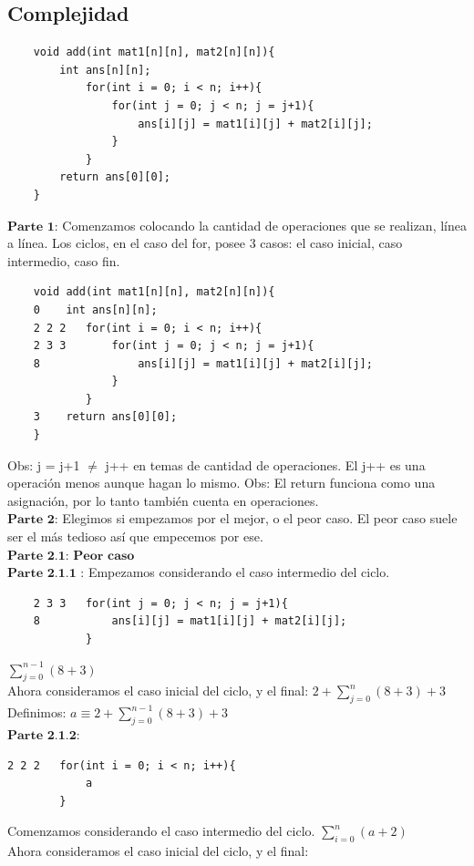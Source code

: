 \documentclass[10pt,a4paper]{article}
\begin{document}
\subsection*{Complejidad}
\begin{lstlisting}
    void add(int mat1[n][n], mat2[n][n]){
        int ans[n][n];
            for(int i = 0; i < n; i++){
                for(int j = 0; j < n; j = j+1){
                    ans[i][j] = mat1[i][j] + mat2[i][j];
                }
            }
        return ans[0][0];
    }
\end{lstlisting}
$\textbf{Parte 1}$: Comenzamos colocando la cantidad de operaciones que se realizan, línea a línea. Los ciclos, en el caso del for, posee 3 casos: el caso inicial, caso intermedio, caso fin.
\begin{lstlisting}
    void add(int mat1[n][n], mat2[n][n]){
    0    int ans[n][n];
    2 2 2   for(int i = 0; i < n; i++){
    2 3 3       for(int j = 0; j < n; j = j+1){
    8               ans[i][j] = mat1[i][j] + mat2[i][j];
                }
            }
    3    return ans[0][0];
    }
\end{lstlisting}
Obs: j = j+1 $\neq$ j++ en temas de cantidad de operaciones. El j++ es una operación menos aunque hagan lo mismo.
Obs: El return funciona como una asignación, por lo tanto también cuenta en operaciones. \\
$\textbf{Parte 2}$: Elegimos si empezamos por el mejor, o el peor caso. El peor caso suele ser el más tedioso así que empecemos por ese. \\
$\textbf{Parte 2.1: Peor caso}$ \\
$\textbf{Parte 2.1.1 }$: Empezamos considerando el caso intermedio del ciclo.
\begin{lstlisting}
    2 3 3   for(int j = 0; j < n; j = j+1){
    8           ans[i][j] = mat1[i][j] + mat2[i][j];
            }
\end{lstlisting}
$ \sum_{j=0}^{n-1}{(8+3)} $ \\
Ahora consideramos el caso inicial del ciclo, y el final: $ 2 + \sum_{j=0}^{n}{(8+3)} + 3$ \\
Definimos:  $a \equiv 2 + \sum_{j=0}^{n-1}{(8+3)} + 3$ \\
$\textbf{Parte 2.1.2}$: 
\begin{lstlisting}
2 2 2   for(int i = 0; i < n; i++){
            a
        }
\end{lstlisting}
Comenzamos considerando el caso intermedio del ciclo.
$ \sum_{i=0}^{n}{(a+2)} $ \\
Ahora consideramos el caso inicial del ciclo, y el final:
\end{document}
